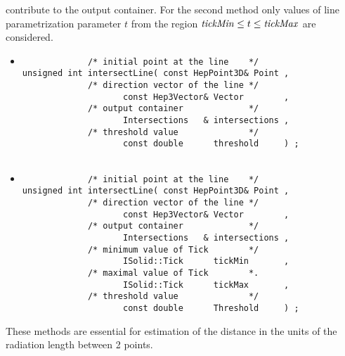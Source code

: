 \begin{itemize}
contribute to the output container. For the second method 
only values of line parametrization parameter $t$ from the region  
${\it tickMin}\leq t \leq {\it tickMax}$ are considered. 
\begin{itemize} 
\item
\begin{verbatim}
             /* initial point at the line    */
unsigned int intersectLine( const HepPoint3D& Point ,      
             /* direction vector of the line */
		            const Hep3Vector& Vector        ,      
             /* output container             */ 
		            Intersections   & intersections ,      
             /* threshold value              */
		            const double      threshold     ) ; 
  
\end{verbatim}
\item
\begin{verbatim}
             /* initial point at the line    */
unsigned int intersectLine( const HepPoint3D& Point , 
             /* direction vector of the line */
		            const Hep3Vector& Vector        ,      
             /* output container             */ 
		            Intersections   & intersections ,     
             /* minimum value of Tick        */ 
		            ISolid::Tick      tickMin       ,     
             /* maximal value of Tick        *.
		            ISolid::Tick      tickMax       , 
             /* threshold value              */
		            const double      Threshold     ) ; 
\end{verbatim}
\end{itemize} 
These methods are essential for 
estimation of the distance in the units of the radiation 
length between 2 points. 
 

\end{itemize} 



